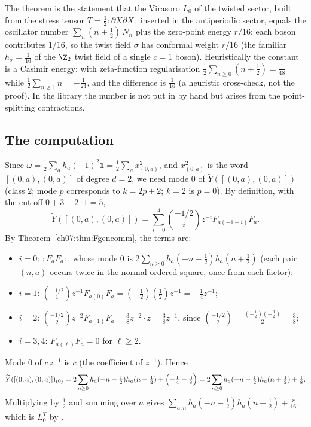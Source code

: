 \begin{physics}
The theorem is the statement that the Virasoro $L_0$ of the twisted sector, built from the stress tensor $T=\tfrac12{:}\partial X\partial X{:}$ inserted in the antiperiodic sector, equals the oscillator number $\sum_n(n+\tfrac12)\,N_n$ plus the zero-point energy $r/16$: each boson contributes $1/16$, so the twist field $\sigma$ has conformal weight $r/16$ (the familiar $h_\sigma=\tfrac1{16}$ of the $\Z_2$ twist field of a single $c=1$ boson). Heuristically the constant is a Casimir energy: with zeta-function regularisation $\tfrac12\sum_{n\ge0}(n+\tfrac12)=\tfrac1{48}$ while $\tfrac12\sum_{n\ge1}n=-\tfrac1{24}$, and the difference is $\tfrac1{16}$ (a heuristic cross-check, not the proof). In the library the number is not put in by hand but arises from the point-splitting contractions.
\end{physics}

\subsection{The computation}

Since $\omega = \frac12\sum_a h_a(-1)^2\mathbf 1 = \frac12\sum_a x_{(0,a)}^2$, and $x_{(0,a)}^2$ is
the word $[(0,a),(0,a)]$ of degree $d=2$, we need mode $0$ of
$\widetilde Y([(0,a),(0,a)])$ (class $2$; mode $p$ corresponds to $k = 2p+2$; $k=2$ is $p=0$).
By definition, with the cut-off $0+3+2\cdot1 = 5$,
\begin{equation*}
  \widetilde Y([(0,a),(0,a)]) = \sum_{i=0}^{4}\binom{-1/2}{i}z^{-i}F_{a(-1+i)}F_a .
\end{equation*}
By Theorem~\ref{ch07:thm:Fgencomm}, the terms are:
\begin{itemize}
  \item $i=0$: ${:}F_aF_a{:}$, whose mode $0$ is $2\sum_{n\ge0}h_a(-n-\frac12)h_a(n+\frac12)$
  (each pair $(n,a)$ occurs twice in the normal-ordered square, once from each factor);
  \item $i=1$: $\binom{-1/2}{1}z^{-1}F_{a(0)}F_a = (-\tfrac12)(\tfrac12)z^{-1} = -\tfrac14
  z^{-1}$;
  \item $i=2$: $\binom{-1/2}{2}z^{-2}F_{a(1)}F_a = \tfrac38 z^{-2}\cdot z = \tfrac38z^{-1}$,
  since $\binom{-1/2}{2} = \frac{(-\frac12)(-\frac32)}{2} = \frac38$;
  \item $i=3,4$: $F_{a(\ell)}F_a=0$ for $\ell\ge2$.
\end{itemize}
Mode $0$ of $c\,z^{-1}$ is $c$ (the coefficient of $z^{-1}$). Hence
\begin{equation}\label{ch07:eq:oneeighth}
  \widetilde Y([(0,a),(0,a)])_{(0)} = 2\sum_{n\ge0}h_a(-n-\tfrac12)h_a(n+\tfrac12) +
  \Bigl(-\tfrac14+\tfrac38\Bigr) = 2\sum_{n\ge0}h_a(-n-\tfrac12)h_a(n+\tfrac12)+\tfrac18.
\end{equation}
Multiplying by $\frac12$ and summing over $a$ gives
$\sum_{a,n}h_a(-n-\frac12)h_a(n+\frac12) + \frac r{16}$, which is $L_0^T$ by
.

